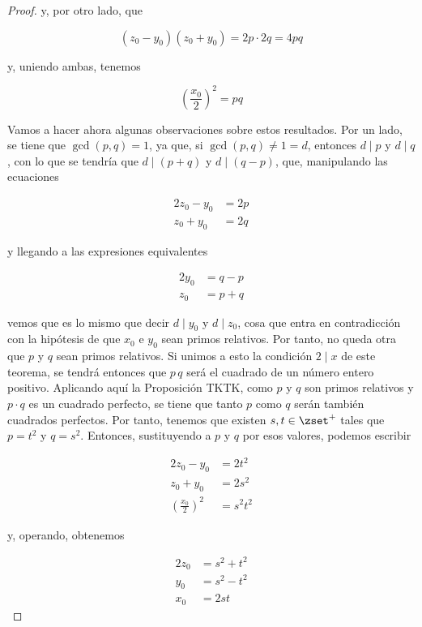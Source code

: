 \begin{proof}
  \noindent y, por otro lado, que

  $$ (z_0 - y_0)(z_0 + y_0) = 2p \cdot 2q = 4pq $$

  \noindent y, uniendo ambas, tenemos

  $$ \left( \frac{x_0}{2} \right)^2 = pq $$

  Vamos a hacer ahora algunas observaciones sobre estos resultados. Por un
  lado, se tiene que $\gcd(p, q) = 1$, ya que, si $\gcd(p, q) \neq 1 = d$,
  entonces $d \mid p$ y $d \mid q$, con lo que se tendría que $d \mid (p +
  q)$ y $d \mid (q - p)$, que, manipulando las ecuaciones

  \begin{alignat*}{2}
    z_0 - y_0   &= 2p \\
    z_0 + y_0   &= 2q
  \end{alignat*}

  \noindent y llegando a las expresiones equivalentes

  \begin{alignat*}{2}
    y_0   &= q - p \\
    z_0   &= p + q
  \end{alignat*}

  \noindent vemos que es lo mismo que decir $d \mid y_0$ y $d \mid z_0$,
  cosa que entra en contradicción con la hipótesis de que $x_0$ e $y_0$ sean
  primos relativos. Por tanto, no queda otra que $p$ y $q$ sean primos
  relativos. Si unimos a esto la condición $2 \mid x$ de este teorema, se
  tendrá entonces que $p \, q$ será el cuadrado de un número entero
  positivo. Aplicando aquí la Proposición TKTK, como $p$ y $q$ son primos
  relativos y $p \cdot q$ es un cuadrado perfecto, se tiene que tanto $p$
  como $q$ serán también cuadrados perfectos. Por tanto, tenemos que existen
  $s, t \in \zset^{+}$ tales que $p = t^2$ y $q = s^2$. Entonces,
  sustituyendo a $p$ y $q$ por esos valores, podemos escribir

  \begin{alignat*}{2}
    z_0 - y_0                       &= 2t^2 \\
    z_0 + y_0                       &= 2s^2 \\
    \left( \frac{x_0}{2} \right)^2  &= s^2 t^2
  \end{alignat*}

  \noindent y, operando, obtenemos

  \begin{alignat*}{2}
    z_0   &= s^2 + t^2 \\
    y_0   &= s^2 - t^2 \\
    x_0   &= 2st
  \end{alignat*}


\end{proof}
